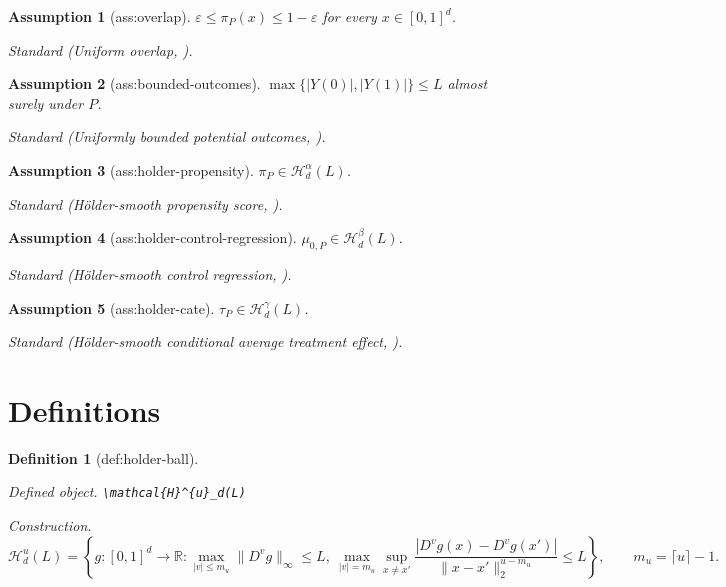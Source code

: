 \documentclass{article}
\newtheorem{assumption}{Assumption}
\newtheorem{definition}{Definition}
\begin{document}
\begin{assumption}[ass:overlap]\label{ass:overlap}
\(\varepsilon\leq\pi_P(x)\leq1-\varepsilon\) for every \(x\in[0,1]^d\).
\par\smallskip\noindent\emph{Standard} (Uniform overlap, \cite{kennedy2024minimax}).
\end{assumption}

\begin{assumption}[ass:bounded-outcomes]\label{ass:bounded-outcomes}
\(\max\{|Y(0)|,|Y(1)|\}\leq L\) almost surely under \(P\).
\par\smallskip\noindent\emph{Standard} (Uniformly bounded potential outcomes, \cite{kennedy2024minimax}).
\end{assumption}

\begin{assumption}[ass:holder-propensity]\label{ass:holder-propensity}
\(\pi_P\in\mathcal{H}^{\alpha}_d(L)\).
\par\smallskip\noindent\emph{Standard} (H\"older-smooth propensity score, \cite{kennedy2024minimax}).
\end{assumption}

\begin{assumption}[ass:holder-control-regression]\label{ass:holder-control-regression}
\(\mu_{0,P}\in\mathcal{H}^{\beta}_d(L)\).
\par\smallskip\noindent\emph{Standard} (H\"older-smooth control regression, \cite{kennedy2024minimax}).
\end{assumption}

\begin{assumption}[ass:holder-cate]\label{ass:holder-cate}
\(\tau_P\in\mathcal{H}^{\gamma}_d(L)\).
\par\smallskip\noindent\emph{Standard} (H\"older-smooth conditional average treatment effect, \cite{kennedy2024minimax}).
\end{assumption}

\section{Definitions}

\begin{definition}[def:holder-ball]\label{def:holder-ball}
\par\smallskip\noindent\emph{Defined object.} \texttt{\textbackslash{}\allowbreak{}mathcal\{H\}\allowbreak{}\textasciicircum{}\{u\}\allowbreak{}\_\allowbreak{}d(L)}
\par\smallskip\noindent\emph{Construction.} \[\mathcal{H}^{u}_d(L)=\left\{g:[0,1]^d\to\mathbb{R}:\max_{|v|\leq m_u}\lVert D^v g\rVert_\infty\leq L,\ \max_{|v|=m_u}\sup_{x\neq x'}\frac{|D^v g(x)-D^v g(x')|}{\lVert x-x'\rVert_2^{u-m_u}}\leq L\right\},\qquad m_u=\lceil u\rceil-1.\]
\end{definition}
\end{document}
